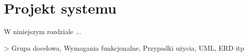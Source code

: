 \chapter{Projekt systemu}

W niniejszym rozdziale ...

> Grupa docelowa, Wymagania funkcjonalne, Przypadki użycia, UML, ERD itp


